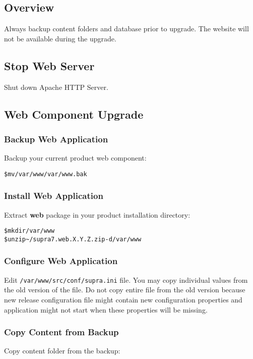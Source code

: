 \documentclass[12pt]{article}
\newcommand{\vigPackageName}{supra7}
\newcommand{\vigPathToProject}{/var/www}
\newcommand{\vigPathToSrc}{/src}
\newcommand{\vigReleasePath}{\textasciitilde/}
\newcommand{\vigReleaseVersion}{X.Y.Z}
\begin{document}
\subsection{Overview}
Always backup content folders and database prior to upgrade. The website will not be available during the upgrade.

\subsection{Stop Web Server}
Shut down Apache HTTP Server.

\subsection{Web Component Upgrade}

\subsubsection{Backup Web Application}
Backup your current product web component:

\begin{alltt}
\$ mv \vigPathToProject \vigPathToProject.bak
\end{alltt}

\subsubsection{Install Web Application}
Extract \textbf{web} package in your product installation directory:

\begin{alltt}
\$ mkdir \vigPathToProject
\$ unzip {\vigReleasePath}{\vigPackageName}.web.\vigReleaseVersion.zip -d \vigPathToProject
\end{alltt}

\subsubsection{Configure Web Application}
Edit \texttt{\vigPathToProject\vigPathToSrc/conf/supra.ini} file. You may copy individual values from the old version of the file. Do not copy entire file from the old version because new release configuration file might contain new configuration properties and application might not start when these properties will be missing.

\subsubsection{Copy Content from Backup}
Copy content folder from the backup:
\end{document}
